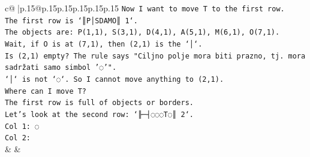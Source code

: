 \documentclass{article}
\begin{document}
{\begin{supertabular}{c@{$\;$}|p{.15\linewidth}@{}p{.15\linewidth}p{.15\linewidth}p{.15\linewidth}p{.15\linewidth}p{.15\linewidth}}
{{{\texttt{Now I want to move T to the first row.} \\
\texttt{The first row is `║P│SDAMO║ 1`.} \\
\texttt{The objects are: P(1,1), S(3,1), D(4,1), A(5,1), M(6,1), O(7,1).} \\
\texttt{Wait, if O is at (7,1), then (2,1) is the `│`.} \\
\texttt{Is (2,1) empty? The rule says "Ciljno polje mora biti prazno, tj. mora sadržati samo simbol '◌'".} \\
\texttt{`│` is not `◌`. So I cannot move anything to (2,1).} \\
\texttt{Where can I move T?} \\
\texttt{The first row is full of objects or borders.} \\
\texttt{Let's look at the second row: `╟─┤◌◌◌T◌║ 2`.} \\
\texttt{Col 1: ◌} \\
\texttt{Col 2:} \\
            }
        }
    }
    & & \\ \\


\end{supertabular}}
\end{document}
